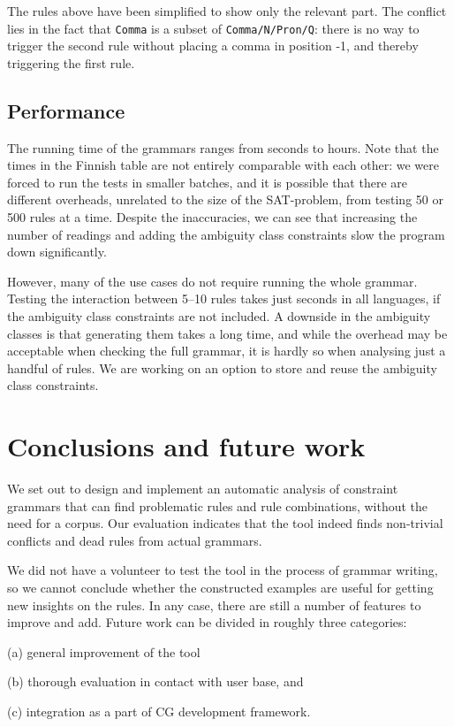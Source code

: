 The rules above have been simplified to show only the relevant part.
The conflict lies in the fact that \texttt{Comma} is a subset of \texttt{Comma/N/Pron/Q}:
there is no way to trigger the second rule without placing a comma in position -1, and thereby triggering the first rule.




\subsection{Performance} 
The running time of the grammars ranges from seconds to hours. 
Note that the times in the Finnish table are not entirely comparable with each other: we were forced to run the tests in smaller batches, and it is possible that there are different overheads, unrelated to the size of the SAT-problem, from testing 50 or 500 rules at a time. 
Despite the inaccuracies, we can see that increasing the number of readings 
and adding the ambiguity class constraints
slow the program down significantly.

However, many of the use cases do not require running the whole
grammar. Testing the interaction between 5--10 rules takes just
seconds in all languages, if the ambiguity class constraints are not included. 
A downside in the ambiguity classes is that generating them takes a long time, 
and while the overhead may be acceptable when checking the full grammar,
it is hardly so when analysing just a handful of rules. 
We are working on an option to store and reuse the ambiguity class constraints.

\section{Conclusions and future work}

We set out to design and implement an automatic analysis of constraint grammars that can find problematic rules and rule combinations, without the need for a corpus.
Our evaluation indicates that the tool indeed finds non-trivial conflicts and dead rules
from actual grammars. 

We did not have a volunteer to test the tool in
the process of grammar writing, so we cannot conclude whether the
constructed examples are useful for getting new insights on the rules.
In any case, there are still a number of features to improve and add.
Future work can be divided in roughly three categories: 
\begin{inparaenum}
\item[(a)] general improvement of the tool
\item[(b)] thorough evaluation in contact with user base, and
\item[(c)] integration as a part of CG development framework.
\end{inparaenum}

